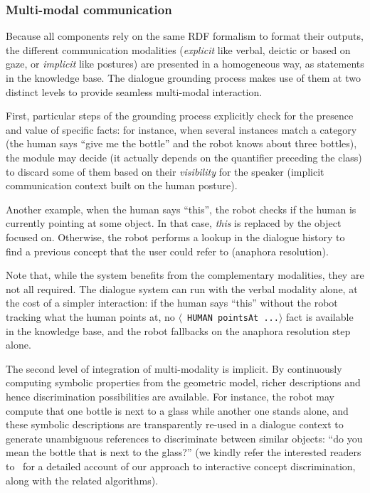 \documentclass[preprint,3p,times]{elsarticle}
\newcommand{\stmt}[1]{{\footnotesize \tt $\langle$ #1\relax$\rangle$}}
\begin{document}
\subsubsection{Multi-modal communication}

Because all components rely on the same RDF formalism to format their outputs,
the different communication modalities (\emph{explicit} like verbal, deictic or
based on gaze, or \emph{implicit} like postures) are presented in a homogeneous
way, as statements in the knowledge base. The dialogue grounding process makes
use of them at two distinct levels to provide seamless multi-modal interaction.

First, particular steps of the grounding process explicitly check for the
presence and value of specific facts: for instance, when several instances
match a category (the human says ``give me the bottle'' and the robot knows
about three bottles), the module may decide (it actually depends on the
quantifier preceding the class) to discard some of them based on their
\emph{visibility} for the speaker (implicit communication context built on the
human posture).

Another example, when the human says ``this'', the robot checks if the human is
currently pointing at some object. In that case, \emph{this} is replaced by the
object focused on. Otherwise, the robot performs a lookup in the dialogue history
to find a previous concept that the user could refer to (anaphora resolution).

Note that, while the system benefits from the complementary modalities, they are
not all required. The dialogue system can run with the verbal modality alone, at
the cost of a simpler interaction: if the human says ``this'' without the robot
tracking what the human points at, no \stmt{HUMAN pointsAt ...} fact is
available in the knowledge base, and the robot fallbacks on the anaphora
resolution step alone.

The second level of integration of multi-modality is implicit. By continuously
computing symbolic properties from the geometric model, richer descriptions and
hence discrimination possibilities are available. For instance, the robot may
compute that one bottle is next to a glass while another one stands alone, and
these symbolic descriptions are transparently re-used in a dialogue context to
generate unambiguous references to discriminate between similar objects: ``do
you mean the bottle that is next to the glass?'' (we kindly refer the interested
readers to~\cite{Ros2010b} for a detailed account of our approach to interactive
concept discrimination, along with the related algorithms).
\end{document}
